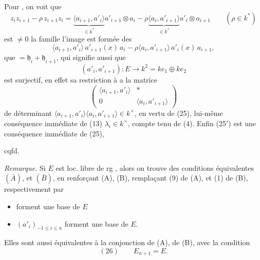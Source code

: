\documentclass[11pt,a4paper]{article}
\begin{document}
Pour , on voit que
\[
z_i z_{i+1} - \rho\, z_{i+1} z_i = \underbrace{\langle a_{i+1}, a'_i\rangle}_{\in k^*} a'_{i+1}\otimes a_i - \rho \underbrace{\langle a_i, a'_{i+1}\rangle}_{\in k^*} a'_i \otimes a_{i+1} \qquad (\rho \in k^*)
\]
 est $\neq 0$ \struck{\ill{} \ill{}} la famille  l'image est formée des
\[
\langle a_{i+1}, a'_i\rangle\, a'_{i+1}(x)\, a_i - \rho \langle a_i, a'_{i+1}\rangle\, a'_i(x)\, a_{i+1},
\]
\ill{} que \ill{}  $= \mathfrak{h}_i + \mathfrak{h}_{i+1}$,  qui  signifie aussi que
\[
(a'_i, a'_{i+1}) : E \longrightarrow k^2 = k e_1 \oplus k e_2
\]
est surjectif, en effet  sa restriction à  a la matrice 
\[
\begin{pmatrix} \langle a_{i+1}, a'_i\rangle & * \\ 0 & \langle a_i, a'_{i+1}\rangle \end{pmatrix}
\]
de déterminant $\langle a_{i+1}, a'_i\rangle \langle a_i, a'_{i+1}\rangle \in k^\times$, en vertu de (25), lui-même conséquence immédiate de (13) $\lambda_i \in k^\times$, compte tenu de (4). Enfin (25$'$) est une conséquence immédiate de (25),

cqfd.

\emph{Remarque.} Si $E$ est loc. libre de rg , alors on trouve des conditions équivalentes $(\bar A)$,  et $(\bar B)$, en renforçant (A), (B), remplaçant (9) de (A), et (1) de (B), respectivement par
\begin{itemize}
\item[(9$'$)]  forment une base de $E$
\item[(12$'$)] $(a'_i)_{-1 \leq i \leq n}$ forment une base de $E$.
\end{itemize}
 Elles sont aussi équivalentes à la conjonction de (A), de (B), avec la condition
\[
(26) \qquad E_{n+1} = E .
\]
 
\end{document}
